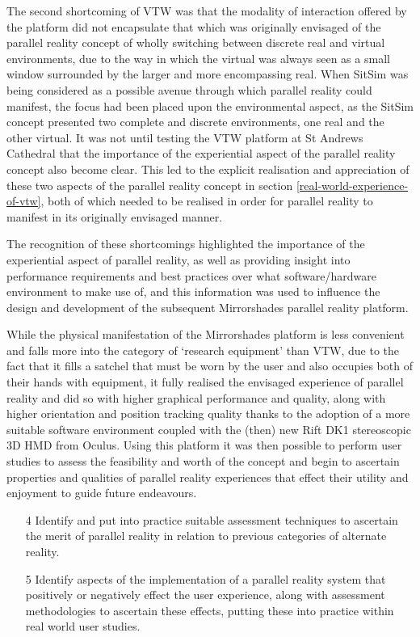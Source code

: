The second shortcoming of VTW was that the modality of interaction offered by the platform did not encapsulate that which was originally envisaged of the parallel reality concept of wholly switching between discrete real and virtual environments, due to the way in which the virtual was always seen as a small window surrounded by the larger and more encompassing real. When SitSim was being considered as a possible avenue through which parallel reality could manifest, the focus had been placed upon the environmental aspect, as the SitSim concept presented two complete and discrete environments, one real and the other virtual. It was not until testing the VTW platform at St Andrews Cathedral that the importance of the experiential aspect of the parallel reality concept also become clear. This led to the explicit realisation and appreciation of these two aspects of the parallel reality concept in section \ref{real-world-experience-of-vtw}, both of which needed to be realised in order for parallel reality to manifest in its originally envisaged manner.

The recognition of these shortcomings highlighted the importance of the experiential aspect of parallel reality, as well as providing insight into performance requirements and best practices over what software/hardware environment to make use of, and this information was used to influence the design and development of the subsequent Mirrorshades parallel reality platform.

While the physical manifestation of the Mirrorshades platform is less convenient and falls more into the category of `research equipment' than VTW, due to the fact that it fills a satchel that must be worn by the user and also occupies both of their hands with equipment, it fully realised the envisaged experience of parallel reality and did so with higher graphical performance and quality, along with higher orientation and position tracking quality thanks to the adoption of a more suitable software environment coupled with the (then) new Rift DK1 stereoscopic 3D HMD from Oculus. Using this platform it was then possible to perform user studies to assess the feasibility and worth of the concept and begin to ascertain properties and qualities of parallel reality experiences that effect their utility and enjoyment to guide future endeavours.

\begin{enumerate}	
	\item[4] Identify and put into practice suitable assessment techniques to ascertain the merit of parallel reality in relation to previous categories of alternate reality.
	\item[5] Identify aspects of the implementation of a parallel reality system that positively or negatively effect the user experience, along with assessment methodologies to ascertain these effects, putting these into practice within real world user studies.
\end{enumerate}

